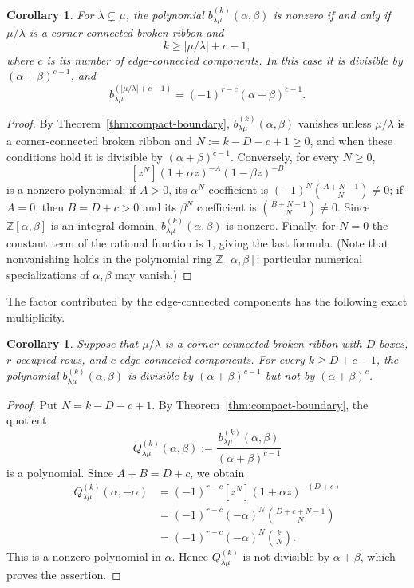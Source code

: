 \documentclass[11pt]{amsart}
\numberwithin{equation}{section}
\newtheorem{corollary}[theorem]{Corollary}
\theoremstyle{definition}
\theoremstyle{remark}
\newcommand{\ZZ}{\mathbb Z}
\begin{document}
\begin{corollary}
\label{cor:sharp-support}
For $\lambda\subsetneq\mu$, the polynomial
$b^{(k)}_{\lambda\mu}(\alpha,\beta)$ is nonzero if and only if
$\mu/\lambda$ is a corner-connected broken ribbon and
\[
 k\geq |\mu/\lambda|+c-1,
\]
where $c$ is its number of edge-connected components. In this case it
is divisible by $(\alpha+\beta)^{c-1}$, and
\[
 b^{(|\mu/\lambda|+c-1)}_{\lambda\mu}
 =(-1)^{r-c}(\alpha+\beta)^{c-1}.
\]
\end{corollary}

\begin{proof}
By Theorem~\ref{thm:compact-boundary}, $b^{(k)}_{\lambda\mu}(\alpha,\beta)$
vanishes unless $\mu/\lambda$ is a corner-connected broken ribbon and
$N:=k-D-c+1\geq0$, and when these conditions hold it is divisible by
$(\alpha+\beta)^{c-1}$. Conversely, for every $N\geq0$,
\[
 [z^N](1+\alpha z)^{-A}(1-\beta z)^{-B}
\]
is a nonzero polynomial: if $A>0$, its $\alpha^N$ coefficient is
$(-1)^N\binom{A+N-1}{N}\neq0$; if $A=0$, then $B=D+c>0$ and its
$\beta^N$ coefficient is $\binom{B+N-1}{N}\neq0$. Since
$\ZZ[\alpha,\beta]$ is an integral domain, $b^{(k)}_{\lambda\mu}(\alpha,\beta)$
is nonzero. Finally, for $N=0$ the constant term of the rational function is
$1$, giving the last formula. (Note that nonvanishing holds in the polynomial
ring $\ZZ[\alpha,\beta]$; particular numerical specializations of
$\alpha,\beta$ may vanish.)
\end{proof}

The factor contributed by the edge-connected components has
the following exact multiplicity.

\begin{corollary}
\label{cor:exact-component-divisibility}
Suppose that $\mu/\lambda$ is a corner-connected broken ribbon with
$D$ boxes, $r$ occupied rows, and $c$ edge-connected components.
For every $k\geq D+c-1$, the polynomial
$b^{(k)}_{\lambda\mu}(\alpha,\beta)$ is divisible by
$(\alpha+\beta)^{c-1}$ but not by $(\alpha+\beta)^c$.
\end{corollary}

\begin{proof}
Put $N=k-D-c+1$. By Theorem~\ref{thm:compact-boundary},
the quotient
\[
 Q_{\lambda\mu}^{(k)}(\alpha,\beta)
 :=\frac{b^{(k)}_{\lambda\mu}(\alpha,\beta)}
          {(\alpha+\beta)^{c-1}}
\]
is a polynomial. Since $A+B=D+c$, we obtain
\begin{align*}
 Q_{\lambda\mu}^{(k)}(\alpha,-\alpha)
 &=(-1)^{r-c}[z^N](1+\alpha z)^{-(D+c)}\\
 &=(-1)^{r-c}(-\alpha)^N
   \binom{D+c+N-1}{N}\\
 &=(-1)^{r-c}(-\alpha)^N\binom{k}{N}.
\end{align*}
This is a nonzero polynomial in $\alpha$. Hence
$Q_{\lambda\mu}^{(k)}$ is not divisible by $\alpha+\beta$,
which proves the assertion.
\end{proof}
\end{document}
